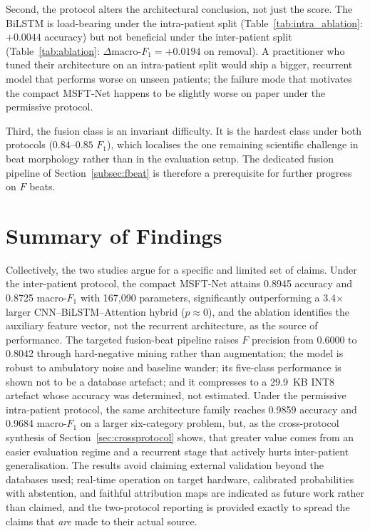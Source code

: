 Second, the protocol alters the architectural conclusion, not just the
score. The BiLSTM is load-bearing under the intra-patient split
(Table~\ref{tab:intra_ablation}: $+0.0044$ accuracy) but not beneficial
under the inter-patient split (Table~\ref{tab:ablation}:
$\Delta\text{macro-}F_1 = +0.0194$ on removal). A practitioner who tuned
their architecture on an intra-patient split would ship a bigger, recurrent
model that performs worse on unseen patients; the failure mode that
motivates the compact MSFT-Net happens to be slightly worse on paper under
the permissive protocol.

Third, the fusion class is an invariant difficulty. It is the hardest class
under both protocols ($0.84$--$0.85$ $F_1$), which localises the one
remaining scientific challenge in beat morphology rather than in the
evaluation setup. The dedicated fusion pipeline of
Section~\ref{subsec:fbeat} is therefore a prerequisite for further
progress on $F$ beats.


\section{Summary of Findings}
\label{sec:summary}

Collectively, the two studies argue for a specific and limited set of
claims. Under the inter-patient protocol, the compact MSFT-Net attains
0.8945 accuracy and 0.8725 macro-$F_1$ with 167{,}090 parameters,
significantly outperforming a 3.4$\times$ larger
CNN--BiLSTM--Attention hybrid ($p \approx 0$), and the ablation identifies
the auxiliary feature vector, not the recurrent architecture, as the source
of performance. The targeted fusion-beat pipeline raises $F$ precision from
0.6000 to 0.8042 through hard-negative mining rather than augmentation; the
model is robust to ambulatory noise and baseline wander; its five-class
performance is shown not to be a database artefact; and it compresses to a
29.9~KB INT8 artefact whose accuracy was determined, not estimated. Under
the permissive intra-patient protocol, the same architecture family
reaches 0.9859 accuracy and 0.9684 macro-$F_1$ on a larger six-category
problem, but, as the cross-protocol synthesis of
Section~\ref{sec:crossprotocol} shows, that greater value comes from an
easier evaluation regime and a recurrent stage that actively hurts
inter-patient generalisation. The results avoid claiming external
validation beyond the databases used; real-time operation on target
hardware, calibrated probabilities with abstention, and faithful attribution
maps are indicated as future work rather than claimed, and the two-protocol
reporting is provided exactly to spread the claims that \emph{are} made to
their actual source.